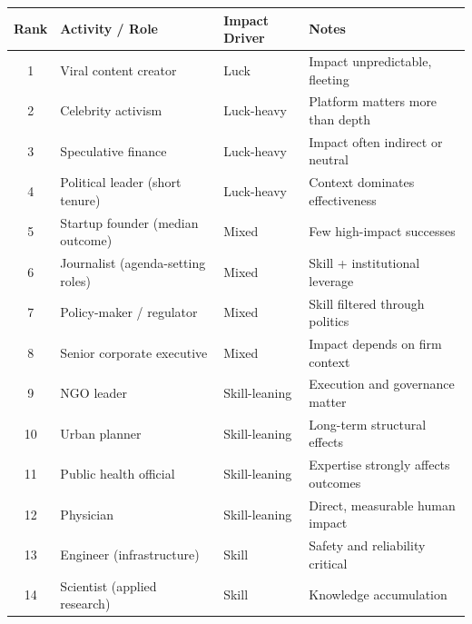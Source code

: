 \begin{table}[H]
  \centering
  \small
  \begin{tabular}{clll}
    \toprule \textbf{Rank} & \textbf{Activity / Role}                & \textbf{Impact Driver} & \textbf{Notes}                      \\
    \midrule 1             & Viral content creator                   & Luck                   & Impact unpredictable, fleeting      \\
    2                      & Celebrity activism                      & Luck-heavy             & Platform matters more than depth    \\
    3                      & Speculative finance                     & Luck-heavy             & Impact often indirect or neutral    \\
    4                      & Political leader (short tenure)         & Luck-heavy             & Context dominates effectiveness     \\
    5                      & Startup founder (median outcome)        & Mixed                  & Few high-impact successes           \\
    6                      & Journalist (agenda-setting roles)       & Mixed                  & Skill + institutional leverage      \\
    7                      & Policy-maker / regulator                & Mixed                  & Skill filtered through politics     \\
    8                      & Senior corporate executive              & Mixed                  & Impact depends on firm context      \\
    9                      & NGO leader                              & Skill-leaning          & Execution and governance matter     \\
    10                     & Urban planner                           & Skill-leaning          & Long-term structural effects        \\
    11                     & Public health official                  & Skill-leaning          & Expertise strongly affects outcomes \\
    12                     & Physician                               & Skill-leaning          & Direct, measurable human impact     \\
    13                     & Engineer (infrastructure)               & Skill                  & Safety and reliability critical     \\
    14                     & Scientist (applied research)            & Skill                  & Knowledge accumulation              \\

\end{tabular}
\end{table}
